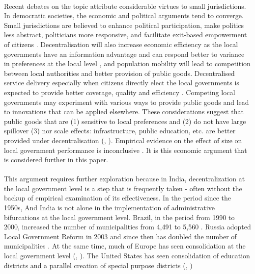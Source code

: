 \documentclass[12pt, a4paper]{article}
\begin{document}
\paragraph{} Recent debates on the topic attribute considerable virtues to small jurisdictions. In democratic societies, the economic and political arguments tend to converge. Small jurisdictions are believed to enhance political participation, make politics less abstract, politicians more responsive, and facilitate exit-based empowerment of citizens \parencite{hansen_size_2014}. Decentralisation will also increase economic efficiency as the local governments have an information advantage and can respond better to variance in preferences at the local level \parencite{oates_fiscal_1972}, and population mobility will lead to competition between local authorities and better provision of public goods. Decentralised service delivery especially when citizens directly elect the local governments is expected to provide better coverage, quality and efficiency \parencite{smoke2015rethinking}. Competing local governments may experiment with various ways to provide public goods and lead to innovations that can be applied elsewhere. These considerations suggest that public goods that are (1) sensitive to local preferences and (2) do not have large spillover (3) nor scale effects: infrastructure, public education, etc. are better provided under decentralisation (\cite{tiebout_economies_1960}, \cite{oates_fiscal_1972}). Empirical evidence on the effect of size on local government performance is inconclusive  \parencite{holzer2009literature}. It is this economic argument that is considered further in this paper.
\paragraph{} This argument requires further exploration because in India, decentralization at the local government level is a step that is frequently taken - often without the backup of empirical examination of its effectiveness. In the period since the 1950s, And India is not alone in the implementation of administrative bifurcations at the local government level. Brazil, in the period from 1990 to 2000, increased the number of municipalities from 4,491 to 5,560 \parencite{tomio2005creation}. Russia adopted Local Government Reform in 2003 and since then has doubled the number of municipalities \parencite{turgel2008new}. At the same time, much of Europe has seen consolidation at the local government level (\cite{mouritzen_danish_2010}, \cite{bikker_scale_2016}). The United States has seen consolidation of education districts and a parallel creation of special purpose districts (\cite{strang1987administrative}, \cite{mccabe2000special}) 
\end{document}
